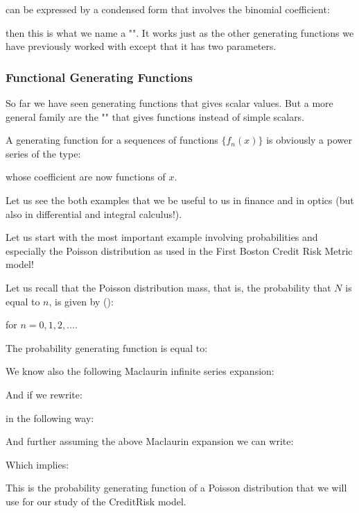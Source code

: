 	can be expressed by a condensed form that involves the binomial coefficient:
	
	then this is what we name a "". It works just as the other generating functions we have previously worked with except that it has two parameters.
	
	\subsubsection{Functional Generating Functions}
	So far we have seen generating functions that gives scalar values. But a more general family are the "" that gives functions instead of simple scalars.
	
	A generating function for a sequences of functions $\{f_n(x)\}$ is obviously a power series of the type:
	
	whose coefficient are now functions of $x$.
	
	Let us see the both examples that we be useful to us in finance and in optics (but also in differential and integral calculus!).
	
	Let us start with the most important example involving probabilities and especially the Poisson distribution as used in the First Boston Credit Risk Metric model!
	
	Let us recall that the Poisson distribution mass, that is, the probability that $N$ is equal to $n$, is given by ():
	
	for $n=0,1,2,\ldots$.

	The probability generating function is equal to:
	
	We know also the following Maclaurin infinite series expansion:
	
	And if we rewrite:
	
	in the following way:
	
	And further assuming the above Maclaurin expansion we can write:
	
	Which implies:
	
	This is the probability generating function of a Poisson distribution that we will use for our study of the CreditRisk model.
	
